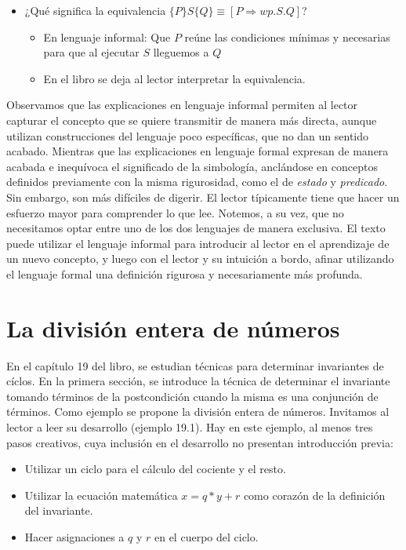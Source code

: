 \documentclass[11pt, a4paper, openany]{book}
\begin{document}
\begin{itemize}
\begin{itemize}
\begin{quote}
            \end{quote}
        \end{itemize}
        \item ¿Qué significa la equivalencia \begin{math}
            \{P\}S\{Q\} \equiv [P \Rightarrow wp.S.Q]
        \end{math}?
        \begin{itemize}
            \item En lenguaje informal: Que $P$ reúne las condiciones mínimas y necesarias para que al ejecutar $S$ lleguemos a $Q$
            \item En el libro se deja al lector interpretar la equivalencia.
        \end{itemize}
    \end{itemize}

    Observamos que las explicaciones en lenguaje informal permiten al lector capturar el concepto que se quiere transmitir de manera más directa, aunque utilizan construcciones del lenguaje poco específicas, que no dan un sentido acabado. Mientras que las explicaciones en lenguaje formal expresan de manera acabada e inequívoca el significado de la simbología, anclándose en conceptos definidos previamente con la misma rigurosidad, como el de \textit{estado} y \textit{predicado}. Sin embargo, son más difíciles de digerir. El lector típicamente tiene que hacer un esfuerzo mayor para comprender lo que lee.
    Notemos, a su vez, que no necesitamos optar entre uno de los dos lenguajes de manera exclusiva. El texto puede utilizar el lenguaje informal para introducir al lector en el aprendizaje de un nuevo concepto, y luego con el lector y su intuición a bordo, afinar utilizando el lenguaje formal una definición rigurosa y necesariamente más profunda.

    \section{La división entera de números}
    En el capítulo 19 del libro, se estudian técnicas para determinar invariantes de cíclos. En la primera sección, se introduce la técnica de determinar el invariante tomando términos de la postcondición cuando la misma es una conjunción de términos. Como ejemplo se propone la división entera de números. Invitamos al lector a leer su desarrollo (ejemplo 19.1).
    Hay en este ejemplo, al menos tres pasos creativos, cuya inclusión en el desarrollo no presentan introducción previa:
        \begin{itemize}
            \item Utilizar un ciclo para el cálculo del cociente y el resto.
            \item Utilizar la ecuación matemática $x = q * y + r$ como corazón de la definición del invariante.
            \item Hacer asignaciones a $q$ y $r$ en el cuerpo del ciclo. 
        \end{itemize}
\end{document}
